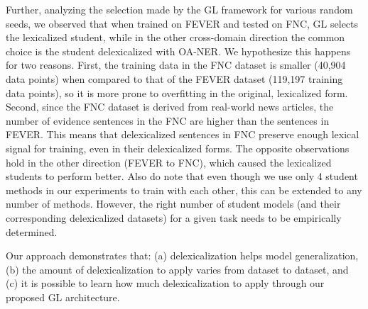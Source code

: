 Further, analyzing the selection made by the GL framework for various random seeds, we observed that when trained on FEVER and tested on FNC, GL selects the lexicalized student, while in the other cross-domain direction the common choice is the student delexicalized with OA-NER. 
We hypothesize this happens for two reasons. First, the training data in the FNC dataset is smaller (40,904 data points) when compared to that of the FEVER dataset (119,197 training data points), so it is more prone to overfitting in the original, lexicalized form. Second, since the FNC dataset is derived from real-world news articles, the number of evidence sentences in the FNC are higher than the sentences in FEVER. This means that delexicalized sentences in FNC preserve enough lexical signal for training, even in their delexicalized forms. The opposite observations hold in the other direction (FEVER to FNC), which caused the lexicalized students to perform better. 
Also do note that even though we use only 4 student methods  in our experiments to train with  each other, this can be extended to any number of methods. However, the right number of student models (and their corresponding delexicalized datasets) for a given task needs to be empirically determined. 

Our approach demonstrates that: (a) delexicalization helps model generalization, (b) the amount of delexicalization to apply varies from dataset to dataset, and (c) it is possible to learn how much delexicalization to apply through our proposed GL architecture.



